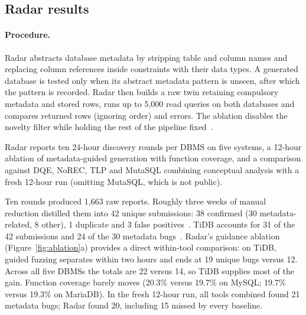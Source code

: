 \begin{verdicts}
\end{verdicts}

\subsection{Radar results}
\paragraph{Procedure.} Radar abstracts database metadata by stripping table and column names and replacing column references inside constraints with their data types. A generated database is tested only when its abstract metadata pattern is unseen, after which the pattern is recorded. Radar then builds a raw twin retaining compulsory metadata and stored rows, runs up to 5,000 read queries on both databases and compares returned rows (ignoring order) and errors. The ablation disables the novelty filter while holding the rest of the pipeline fixed~\cite[Secs.~3.1, 3.4--3.5, 4.3]{radar}.

Radar reports ten 24-hour discovery rounds per DBMS on five systems, a 12-hour ablation of metadata-guided generation with function coverage, and a comparison against DQE, NoREC, TLP and MutaSQL combining conceptual analysis with a fresh 12-hour run (omitting MutaSQL, which is not public).

Ten rounds produced 1,663 raw reports. Roughly three weeks of manual reduction distilled them into 42 unique submissions: 38 confirmed (30 metadata-related, 8 other), 1 duplicate and 3 false positives~\cite[Sec.~4.2]{radar}. TiDB accounts for 31 of the 42 submissions and 24 of the 30 metadata bugs~\cite[Table~2]{radar}. Radar's guidance ablation (Figure~\ref{fig:ablation}a) provides a direct within-tool comparison: on TiDB, guided fuzzing separates within two hours and ends at 19 unique bugs versus 12. Across all five DBMSs the totals are 22 versus 14, so TiDB supplies most of the gain. Function coverage barely moves (20.3\% versus 19.7\% on MySQL; 19.7\% versus 19.3\% on MariaDB). In the fresh 12-hour run, all tools combined found 21 metadata bugs; Radar found 20, including 15 missed by every baseline.

